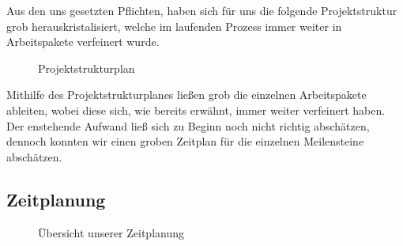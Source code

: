 Aus den uns gesetzten Pflichten, haben sich für uns die folgende Projektstruktur grob herauskristalisiert, welche im laufenden Prozess immer weiter in Arbeitspakete verfeinert wurde.


\begin{center}
	\begin{figure}[h]
		 \noindent{}
		 \caption[Projektstrukturplan]{Projektstrukturplan} 

	\end{figure}
\end{center}

Mithilfe des Projektstrukturplanes ließen grob die einzelnen Arbeitspakete ableiten, wobei diese sich, wie bereits erwähnt, immer weiter verfeinert haben. Der enstehende Aufwand ließ sich zu Beginn noch nicht richtig abschätzen, dennoch konnten wir einen groben Zeitplan für die einzelnen Meilensteine abschätzen.

\newpage

\subsection{Zeitplanung} \label{Zeitplanung}

\begin{center}
	\begin{figure}[h]

	 \noindent{}
	 \caption[Übersicht unserer Zeitplanung]{Übersicht unserer Zeitplanung}
	 \label{fig:zeitplanung}
	\end{figure}
\end{center}

